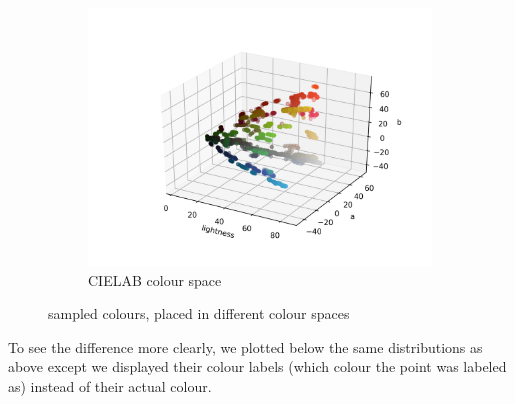 \documentclass[12pt,a4paper]{article}
\begin{document}
\begin{center}
\begin{figure}[H]
\begin{subfigure}{.5\linewidth}
				\includegraphics[width=\linewidth]{images/lab.png}
				\caption{CIELAB colour space}
			\end{subfigure}
			\caption{sampled colours, placed in different colour spaces}
		\end{figure}
	\end{center}

	To see the difference more clearly, we plotted below the same distributions as above except we displayed their colour labels (which colour the point was labeled as) instead of their actual colour.
\end{document}
